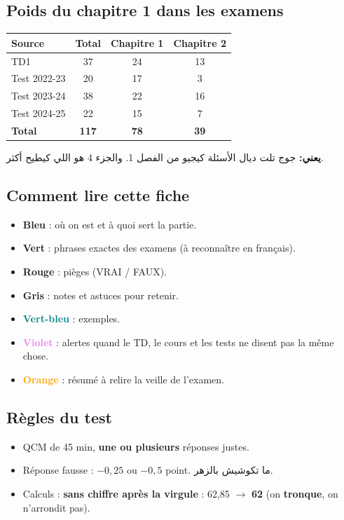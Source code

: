 \documentclass[11pt,a4paper]{article}
\newcommand{\ar}[1]{\textarabic{#1}}
\begin{document}
\subsection*{Poids du chapitre 1 dans les examens}
\begin{center}
\begin{tabular}{lccc}
\toprule
\textbf{Source} & \textbf{Total} & \textbf{Chapitre 1} & \textbf{Chapitre 2} \\
\midrule
TD1 & 37 & 24 & 13 \\
Test 2022-23 & 20 & 17 & 3 \\
Test 2023-24 & 38 & 22 & 16 \\
Test 2024-25 & 22 & 15 & 7 \\
\midrule
\textbf{Total} & \textbf{117} & \textbf{78} & \textbf{39} \\
\bottomrule
\end{tabular}
\end{center}
\par\begin{Arabic}
\textbf{يعني:} جوج تلت ديال الأسئلة كيجيو من الفصل 1. والجزء 4 هو اللي كيطيح أكثر.
\end{Arabic}

\subsection*{Comment lire cette fiche}
\begin{itemize}
\item \textcolor{bleu}{\textbf{Bleu}} : où on est et à quoi sert la partie.
\item \textcolor{vert}{\textbf{Vert}} : phrases exactes des examens (à reconnaître en français).
\item \textcolor{rouge}{\textbf{Rouge}} : pièges (VRAI / FAUX).
\item \textcolor{gris}{\textbf{Gris}} : notes et astuces pour retenir.
\item \textcolor{teal}{\textbf{Vert-bleu}} : exemples.
\item \textcolor{violet}{\textbf{Violet}} : alertes quand le TD, le cours et les tests ne disent pas la même chose.
\item \textcolor{orange}{\textbf{Orange}} : résumé à relire la veille de l'examen.
\end{itemize}

\subsection*{Règles du test}
\begin{itemize}
\item QCM de 45 min, \textbf{une ou plusieurs} réponses justes.
\item Réponse fausse : $-0{,}25$ ou $-0{,}5$ point. \ar{ما تكوشيش بالزهر.}
\item Calculs : \textbf{sans chiffre après la virgule} : 62,85 $\rightarrow$ \textbf{62} (on \textbf{tronque}, on n'arrondit pas).
\end{itemize}
\end{document}
